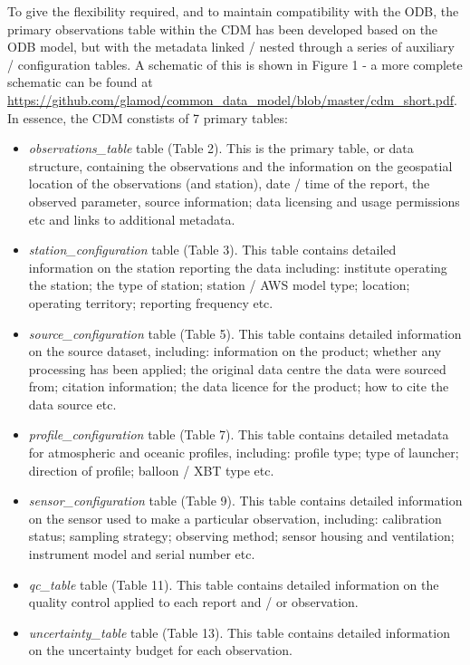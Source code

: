 \documentclass[a4paper]{article}
\begin{document}
To give the flexibility required, and to maintain compatibility with the ODB, the primary observations table within the CDM has been developed based on the ODB model, but with the metadata linked / nested through a series of auxiliary / configuration tables. A schematic of this is shown in Figure 1 - a more complete schematic can be found at \url{https://github.com/glamod/common_data_model/blob/master/cdm_short.pdf}. In essence, the CDM constists of 7 primary tables:\\
\begin{itemize}
\item \textit{observations\_table} table (Table 2). This is the primary table, or data structure, containing the observations and the information on the geospatial location of the observations (and station), date / time of the report, the observed parameter, source information; data licensing and usage permissions etc and links to additional metadata.
\item \textit{station\_configuration} table (Table 3). This table contains detailed information on the station reporting the data including: institute operating the station; the type of station; station / AWS model type; location; operating territory; reporting frequency etc.
\item \textit{source\_configuration} table (Table 5). This table contains detailed information on the source dataset, including: information on the product; whether any processing has been applied; the original data centre the data were sourced from; citation information; the data licence for the product; how to cite the data source etc.
\item \textit{profile\_configuration} table (Table 7). This table contains detailed metadata for atmospheric and oceanic profiles, including: profile type; type of launcher; direction of profile; balloon / XBT type etc.
\item \textit{sensor\_configuration} table (Table 9). This table contains detailed information on the sensor used to make a particular observation, including: calibration status; sampling strategy; observing method; sensor housing and ventilation; instrument model and serial number etc.
\item \textit{qc\_table} table (Table 11). This table contains detailed information on the quality control applied to each report and / or observation.
\item \textit{uncertainty\_table} table (Table 13). This table contains detailed information on the uncertainty budget for each observation.
\end{itemize}
\end{document}
